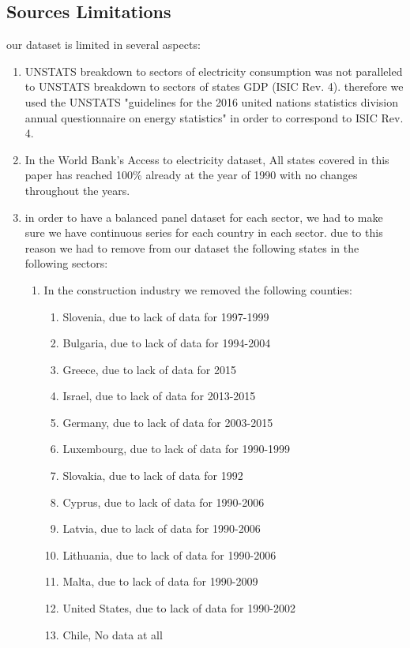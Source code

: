 \documentclass[14pt,oneside]{amsart}
\begin{document}
\begin{appendices}
\subsection{Sources Limitations}
		our dataset is limited in several aspects:
		 \begin{enumerate}
  \item UNSTATS breakdown to sectors of electricity consumption was not paralleled to UNSTATS breakdown to sectors of states GDP (ISIC Rev. 4). therefore we used the UNSTATS "guidelines for the 2016 united nations statistics division annual questionnaire on energy statistics" in order to correspond to ISIC Rev. 4.
  \item In the World Bank's Access to electricity dataset, All states covered in this paper has reached 100\% already at the year of 1990 with no changes throughout the years. 
  \item in order to have a balanced panel dataset for each sector, we had to make sure we have continuous series for each country in each sector. due to this reason we had to remove from our dataset the following states in the following sectors: 
  	\begin{enumerate} 
  	\item In the construction industry we removed the following counties:
		\begin{enumerate}   	 
  	  	\item Slovenia, due to lack of data for 1997-1999
  	  	\item Bulgaria, due to lack of data for 1994-2004
  	  	\item Greece, due to lack of data for 2015
  	  	\item Israel, due to lack of data for 2013-2015
 	  	\item Germany, due to lack of data for 2003-2015
 	  	\item Luxembourg, due to lack of data for 1990-1999
 	  	\item Slovakia, due to lack of data for 1992
 	  	\item Cyprus, due to lack of data for 1990-2006
 	  	\item Latvia, due to lack of data for 1990-2006
 	  	\item Lithuania, due to lack of data for 1990-2006
 	  	\item Malta, due to lack of data for 1990-2009
 	  	\item United States, due to lack of data for 1990-2002
 	  	\item Chile, No data at all

\end{enumerate}
\end{enumerate}
\end{enumerate}
\end{appendices}
\end{document}
